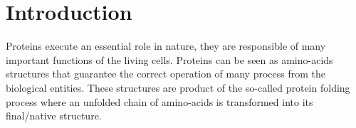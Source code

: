 \documentclass[conference]{IEEEtran}
\begin{document}
%
\IEEEpeerreviewmaketitle



\section{Introduction}

%
Proteins execute an essential role in nature, they are responsible of many important functions of the living cells. Proteins can be seen as amino-acids structures  that guarantee the correct operation of many process from the biological entities. These structures are product of the so-called protein folding process where an unfolded chain of amino-acids is transformed into its final/native structure.


\end{document}
